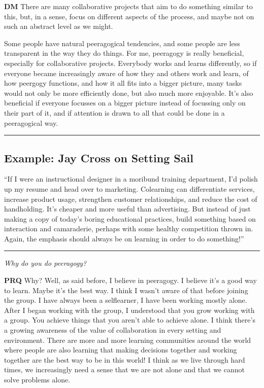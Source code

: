 \textbf{DM} There are many collaborative projects that aim to do
something similar to this, but, in a sense, focus on different aspects
of the process, and maybe not on such an abstract level as we might.

Some people have natural peeragogical tendencies, and some people are
less transparent in the way they do things. For me, peeragogy is really
beneficial, especially for collaborative projects. Everybody works and
learns differently, so if everyone became increasingly aware of how they
and others work and learn, of how peergogy functions, and how it all
fits into a bigger picture, many tasks would not only be more
efficiently done, but also much more enjoyable. It's also beneficial if
everyone focusses on a bigger picture instead of focussing only on their
part of it, and if attention is drawn to all that could be done in a
peeragogical way.

\begin{center}\rule{0.5\linewidth}{\linethickness}\end{center}

\subsection{Example: Jay Cross on Setting
Sail}\label{example-jay-cross-on-setting-sail}

``If I were an instructional designer in a moribund training department,
I'd polish up my resume and head over to marketing. Co­learning can
differentiate services, increase product usage, strengthen customer
relationships, and reduce the cost of hand­holding. It's cheaper and
more useful than advertising. But instead of just making a copy of
today's boring educational practices, build something based on
interaction and camaraderie, perhaps with some healthy competition
thrown in. Again, the emphasis should always be on learning in order to
do something!''

\begin{center}\rule{0.5\linewidth}{\linethickness}\end{center}

\emph{Why do you do peeragogy?}

\textbf{PRQ} Why? Well, as said before, I believe in peeragogy. I
believe it's a good way to learn. Maybe it's the best way. I think I
wasn't aware of that before joining the group. I have always been a
self­learner, I have been working mostly alone. After I began working
with the group, I understood that you grow working with a group. You
achieve things that you aren't able to achieve alone. I think there's a
growing awareness of the value of collaboration in every setting and
environment. There are more and more learning communities around the
world where people are also learning that making decisions together and
working together are the best way to be in this world! I think as we
live through hard times, we increasingly need a sense that we are not
alone and that we cannot solve problems alone.

